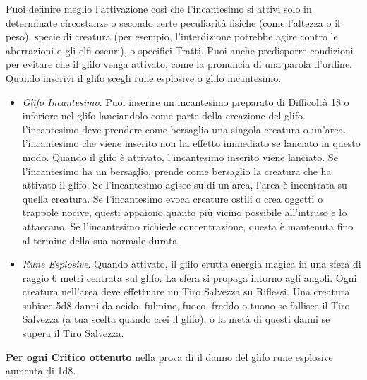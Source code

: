 \begin{multicols}{2}
Puoi definire meglio l’attivazione così che l'incantesimo si attivi solo in determinate circostanze o secondo certe peculiarità fisiche (come l’altezza o il peso), specie di creatura (per esempio, l’interdizione potrebbe agire contro le aberrazioni o gli elfi oscuri), o specifici Tratti. Puoi anche predisporre condizioni per evitare che il glifo  venga attivato, come la pronuncia di una parola d’ordine.\\
Quando inscrivi il glifo scegli rune esplosive o glifo incantesimo.
\medskip
\begin{itemize}
\item
\textit{Glifo Incantesimo}. Puoi inserire un incantesimo preparato di Difficoltà 18 o inferiore nel glifo lanciandolo come parte della creazione del glifo. l'incantesimo deve prendere come bersaglio una singola creatura o un'area. l'incantesimo che viene inserito non ha effetto immediato se lanciato in questo modo. Quando il glifo è attivato, l'incantesimo inserito viene lanciato. Se l'incantesimo ha un bersaglio, prende come bersaglio la creatura che ha attivato il glifo. Se l'incantesimo agisce su di un'area, l’area è incentrata su quella creatura. Se l'incantesimo evoca creature ostili o crea oggetti o trappole nocive, questi appaiono quanto più vicino possibile all'intruso e lo attaccano. Se l'incantesimo richiede concentrazione, questa è mantenuta fino al termine della sua normale durata.
\item
\textit{Rune Esplosive}. Quando attivato, il glifo erutta energia magica in una sfera di raggio 6 metri centrata sul glifo. La sfera si propaga intorno agli angoli. Ogni creatura nell'area deve effettuare un Tiro Salvezza su Riflessi. Una creatura subisce 5d8 danni da acido, fulmine, fuoco, freddo o tuono se fallisce il Tiro Salvezza (a tua scelta quando crei il glifo), o la metà di questi danni se supera il Tiro Salvezza.
\end{itemize}
\medskip
\textbf{Per ogni Critico ottenuto} nella prova di il danno del glifo rune esplosive aumenta di 1d8.


\end{multicols}
